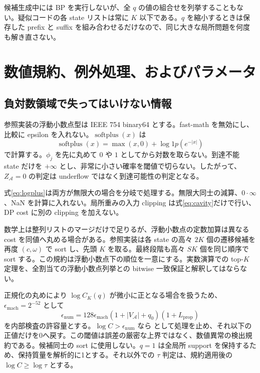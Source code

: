 \documentclass[a4paper,11pt]{ltjsarticle}
\numberwithin{equation}{section}
\theoremstyle{definition}
\newcommand{\A}{\mathcal A}
\newcommand{\softplus}{\operatorname{softplus}}
\newcommand{\code}[1]{\texttt{\detokenize{#1}}}
\begin{document}
候補生成中には BP を実行しないが、全 $q$ の値の組合せを列挙することもない。疑似コードの各 state リストは常に $K$ 以下である。$q$ を縮小するときは保存した prefix と suffix を組み合わせるだけなので、同じ大きな局所問題を何度も解き直さない。

\section{数値規約、例外処理、およびパラメータ}\label{sec:numerics}
\subsection{負対数領域で失ってはいけない情報}
参照実装の浮動小数点型は IEEE 754 binary64 とする。fast-math を無効にし、比較に epsilon を入れない。$\softplus(x)$ は
\begin{equation}
 \softplus(x)=\max(x,0)+\log1p(e^{-|x|})
 \label{eq:stable-softplus}
\end{equation}
で計算する。$\phi_j$ を先に丸めて $0$ や $1$ としてから対数を取らない。到達不能 state だけを $+\infty$ とし、非常に小さい確率を閾値で切らない。したがって、$Z_\A=0$ の判定は underflow ではなく到達可能性の判定となる。

式\eqref{eq:logplus}は両方が無限大の場合を分岐で処理する。無限大同士の減算、$0\cdot\infty$、NaN を計算に入れない。局所重みの入力 clipping は式\eqref{eq:cavity}だけで行い、DP cost に別の clipping を加えない。

数学上は整列リストのマージだけで足りるが、浮動小数点の定数加算は異なる cost を同値へ丸める場合がある。参照実装は各 state の高々 $2K$ 個の遷移候補を再度 $(c,\omega)$ で sort し、先頭 $K$ を取る。最終段階も高々 $SK$ 個を同じ順序で sort する。この規約は浮動小数点下の順位を一意にする。実数演算での top-$K$ 定理を、全割当ての浮動小数点列挙との bitwise 一致保証と解釈してはならない。

正規化の丸めにより $\log C_K(q)$ が微小に正となる場合を扱うため、$\epsilon_{\mathrm{mach}}=2^{-52}$ として
\begin{equation}
 \epsilon_{\mathrm{num}}=
 128\epsilon_{\mathrm{mach}}(1+|V_\A|+q_0)(1+L_{\mathrm{prop}})
 \label{eq:num-tolerance}
\end{equation}
を内部検査の許容量とする。$\log C>\epsilon_{\mathrm{num}}$ なら \code{NUMERICAL_ERROR} として処理を止め、それ以下の正値だけを0へ戻す。この閾値は誤差の厳密な上界ではなく、数値異常の検出規約である。候補同士の sort に使用しない。$q=1$ は全局所 support を保持するため、保持質量を解析的に1とする。それ以外での $\tau$ 判定は、規約適用後の $\log C\ge\log\tau$ とする。
\end{document}
